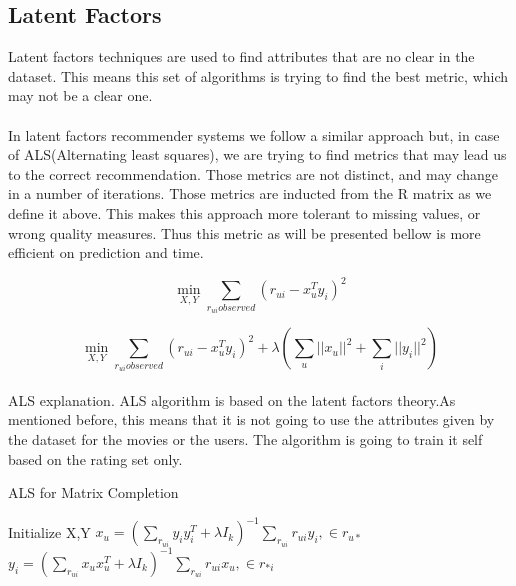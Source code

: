\subsection{Latent Factors}
Latent factors techniques are used to find attributes that are no clear in the dataset. This means this set of algorithms is trying to find the best metric, which may not be a clear one.

\paragraph{} In latent factors recommender systems we follow a similar approach but, in case of ALS(Alternating least squares), we are trying to find metrics that may lead us to the correct recommendation. Those metrics are not distinct, and may change in a number of iterations. Those metrics are inducted from the R matrix as we define it above. This makes this approach more tolerant to missing values, or wrong quality measures. Thus this metric as will be presented bellow is more efficient on prediction and time.
\cite{DistributedAlgorithmsAndOptimization:4}


\begin{equation}
	\min_{X,Y} \sum_{r_{ui}observed}(r_{ui}-x_{u}^{T}y_{i})^{2}
\end{equation}

\begin{equation}
	\min_{X,Y} \sum_{r_{ui}observed}(r_{ui}-x_{u}^{T}y_{i})^{2} + \lambda(\sum_{u}||x_{u}||^2 + \sum_{i}||y_{i}||^2)
\end{equation}



\paragraph{} ALS explanation.
ALS algorithm is based on the latent factors theory.As mentioned before, this means that it is not going to use the attributes given by the dataset for the movies or the users. The algorithm is going to train it self based on the rating set only.


\begin{algorithm}
	\caption{ALS for Matrix Completion}\label{ALS}
	\begin{algorithmic}[1]
		\State Initialize X,Y
		\Repeat
		\State $x_{u} = (\sum_{r_{ui}}y_{i}y_{i}^{T} + \lambda I_k)^{-1} \sum_{r_{ui}}r_{ui}y_{i} ,\in r_{u*}$
		\EndFor
		\State $y_{i} = (\sum_{r_{ui}}x_{u}x_{u}^{T} + \lambda I_k)^{-1} \sum_{r_{ui}}r_{ui}x_{u} ,\in r_{*i}$
		\EndFor
	\end{algorithmic}
\end{algorithm}